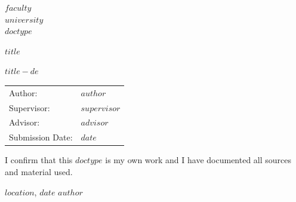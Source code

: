 \documentclass[headsepline,footsepline,footinclude=false,oneside,fontsize=11pt,paper=a4,listof=totoc,bibliography=totoc]{scrbook} %
\begin{document}
  \begin{titlepage}
    \centering
  
  
    \vspace{5mm}
    {\huge\MakeUppercase{$faculty$}}\\
  
    \vspace{5mm}
    {\large\MakeUppercase{$university$}}\\
  
    \vspace{20mm}
    {\Large $doctype$}
  
    \vspace{15mm}
    {\huge\bfseries $title$ \par}
  
    \vspace{10mm}
    {\huge\bfseries \foreignlanguage{ngerman}{$title-de$} \par}
  
    \vspace{15mm}
    \begin{tabular}{l l}
      Author:          & $author$ \\
      Supervisor:      & $supervisor$ \\
      Advisor:         & $advisor$ \\
      Submission Date: & $date$ \\
    \end{tabular}
  
  \end{titlepage}


  \thispagestyle{empty}
  \vspace*{0.8\textheight}
  \noindent
  I confirm that this \MakeLowercase{$doctype$} is my own work and I have documented all sources and material used.
  
  \vspace{15mm}
  \noindent
  $location$, $date$ \hspace{50mm} $author$
  
\end{document}

